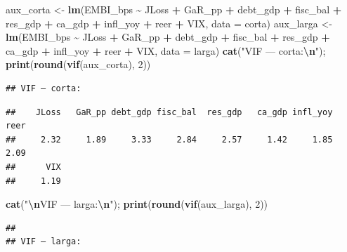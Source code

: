\documentclass[
]{article}
\newenvironment{Shaded}{\begin{snugshade}}{\end{snugshade}}
\newcommand{\AttributeTok}[1]{\textcolor[rgb]{0.13,0.29,0.53}{#1}}
\newcommand{\DecValTok}[1]{\textcolor[rgb]{0.00,0.00,0.81}{#1}}
\newcommand{\FunctionTok}[1]{\textcolor[rgb]{0.13,0.29,0.53}{\textbf{#1}}}
\newcommand{\NormalTok}[1]{#1}
\newcommand{\OtherTok}[1]{\textcolor[rgb]{0.56,0.35,0.01}{#1}}
\newcommand{\SpecialCharTok}[1]{\textcolor[rgb]{0.81,0.36,0.00}{\textbf{#1}}}
\newcommand{\StringTok}[1]{\textcolor[rgb]{0.31,0.60,0.02}{#1}}
\begin{document}
\begin{Shaded}
\begin{Highlighting}[]
\NormalTok{aux\_corta }\OtherTok{\textless{}{-}} \FunctionTok{lm}\NormalTok{(EMBI\_bps }\SpecialCharTok{\textasciitilde{}}\NormalTok{ JLoss }\SpecialCharTok{+}\NormalTok{ GaR\_pp }\SpecialCharTok{+}\NormalTok{ debt\_gdp }\SpecialCharTok{+}\NormalTok{ fisc\_bal }\SpecialCharTok{+}\NormalTok{ res\_gdp }\SpecialCharTok{+}\NormalTok{ ca\_gdp }\SpecialCharTok{+}\NormalTok{ infl\_yoy }\SpecialCharTok{+}\NormalTok{ reer }\SpecialCharTok{+}\NormalTok{ VIX, }\AttributeTok{data =}\NormalTok{ corta)}
\NormalTok{aux\_larga }\OtherTok{\textless{}{-}} \FunctionTok{lm}\NormalTok{(EMBI\_bps }\SpecialCharTok{\textasciitilde{}}\NormalTok{ JLoss }\SpecialCharTok{+}\NormalTok{ GaR\_pp }\SpecialCharTok{+}\NormalTok{ debt\_gdp }\SpecialCharTok{+}\NormalTok{ fisc\_bal }\SpecialCharTok{+}\NormalTok{ res\_gdp }\SpecialCharTok{+}\NormalTok{ ca\_gdp }\SpecialCharTok{+}\NormalTok{ infl\_yoy }\SpecialCharTok{+}\NormalTok{ reer }\SpecialCharTok{+}\NormalTok{ VIX, }\AttributeTok{data =}\NormalTok{ larga)}
\FunctionTok{cat}\NormalTok{(}\StringTok{"VIF — corta:}\SpecialCharTok{\textbackslash{}n}\StringTok{"}\NormalTok{); }\FunctionTok{print}\NormalTok{(}\FunctionTok{round}\NormalTok{(}\FunctionTok{vif}\NormalTok{(aux\_corta), }\DecValTok{2}\NormalTok{))}
\end{Highlighting}
\end{Shaded}

\begin{verbatim}
## VIF — corta:
\end{verbatim}

\begin{verbatim}
##    JLoss   GaR_pp debt_gdp fisc_bal  res_gdp   ca_gdp infl_yoy     reer 
##     2.32     1.89     3.33     2.84     2.57     1.42     1.85     2.09 
##      VIX 
##     1.19
\end{verbatim}

\begin{Shaded}
\begin{Highlighting}[]
\FunctionTok{cat}\NormalTok{(}\StringTok{"}\SpecialCharTok{\textbackslash{}n}\StringTok{VIF — larga:}\SpecialCharTok{\textbackslash{}n}\StringTok{"}\NormalTok{); }\FunctionTok{print}\NormalTok{(}\FunctionTok{round}\NormalTok{(}\FunctionTok{vif}\NormalTok{(aux\_larga), }\DecValTok{2}\NormalTok{))}
\end{Highlighting}
\end{Shaded}

\begin{verbatim}
## 
## VIF — larga:
\end{verbatim}
\end{document}
